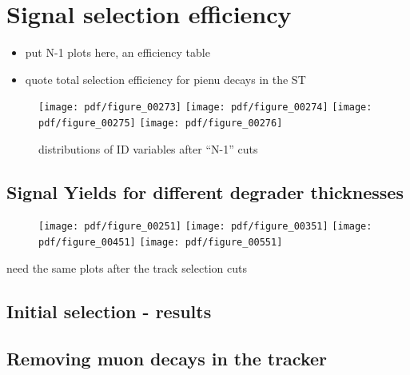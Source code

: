 \section{Signal selection efficiency}

{\red
  \begin{itemize}
  \item 
    put N-1 plots here, an efficiency table
  \item
    quote total selection efficiency for pienu decays in the ST
  \end{itemize}
}

\begin{figure}[H]
  \texttt{[image: pdf/figure\_00273]}
  \texttt{[image: pdf/figure\_00274]}
  \texttt{[image: pdf/figure\_00275]}
  \texttt{[image: pdf/figure\_00276]}
  \caption{
    distributions of ID variables after ``N-1'' cuts
  }
\end{figure}


\subsection {Signal Yields for different degrader thicknesses}
\begin{figure}[H]
  \texttt{[image: pdf/figure\_00251]}
  \texttt{[image: pdf/figure\_00351]}
  \texttt{[image: pdf/figure\_00451]}
  \texttt{[image: pdf/figure\_00551]}
  \caption{
  }
\end{figure}

{\red need the same plots after the track selection cuts}

\subsection{Initial selection - results}




\subsection{Removing muon decays in the tracker}

